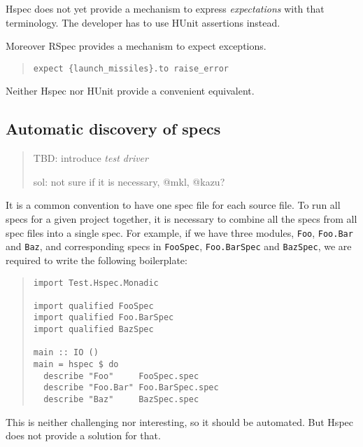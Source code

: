 \documentclass[preprint]{sigplanconf}
\begin{document}
\noindent Hspec does not yet provide a mechanism to express
\emph{expectations} with that terminology.  The developer has to use
HUnit assertions instead.

Moreover RSpec provides a mechanism to expect exceptions.

\begin{quote}
\small
\begin{verbatim}
expect {launch_missiles}.to raise_error
\end{verbatim}
\end{quote}

\noindent Neither Hspec nor HUnit provide a convenient equivalent.

\subsection{Automatic discovery of specs}
\label{sec:problem-discovery}

\begin{quote}
    TBD: introduce \emph{test driver}

    sol: not sure if it is necessary, @mkl, @kazu?
\end{quote}

It is a common convention to have one spec file for each source file.
To run all specs for a given project together, it is necessary to
combine all the specs from all spec files into a single spec.  For
example, if we have three modules, \verb|Foo|, \verb|Foo.Bar| and
\verb|Baz|, and corresponding specs in \verb|FooSpec|,
\verb|Foo.BarSpec| and \verb|BazSpec|, we are required to write the
following boilerplate:

\begin{quote}
\small
\begin{verbatim}
import Test.Hspec.Monadic

import qualified FooSpec
import qualified Foo.BarSpec
import qualified BazSpec

main :: IO ()
main = hspec $ do
  describe "Foo"     FooSpec.spec
  describe "Foo.Bar" Foo.BarSpec.spec
  describe "Baz"     BazSpec.spec
\end{verbatim}
\end{quote}

\noindent This is neither challenging nor interesting, so it should be
automated.  But Hspec does not provide a solution for that.
\end{document}
